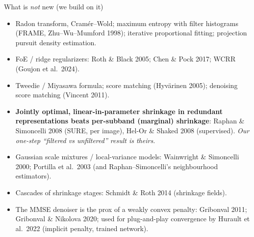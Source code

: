 \documentclass[10pt,aspectratio=169]{beamer}
\begin{document}
\begin{frame}{What is \emph{not} new (we build on it)}
\begin{oldbox}[title={Known results used here}]
\small
\begin{itemize}
\item Radon transform, Cram\'er--Wold; maximum entropy with filter histograms (FRAME, Zhu--Wu--Mumford 1998);
      iterative proportional fitting; projection pursuit density estimation.
\item FoE / ridge regularizers: Roth \& Black 2005; Chen \& Pock 2017; WCRR (Goujon et al.\ 2024).
\item Tweedie / Miyasawa formula; score matching (Hyv\"arinen 2005); denoising score matching (Vincent 2011).
\item \textbf{Jointly optimal, linear-in-parameter shrinkage in redundant representations beats
      per-subband (marginal) shrinkage}: Raphan \& Simoncelli 2008 (SURE, per image), Hel-Or \& Shaked
      2008 (supervised). \emph{Our one-step ``filtered vs unfiltered'' result is theirs.}
\item Gaussian scale mixtures / local-variance models: Wainwright \& Simoncelli 2000; Portilla et al.\ 2003
      (and Raphan--Simoncelli's neighbourhood estimators).
\item Cascades of shrinkage stages: Schmidt \& Roth 2014 (shrinkage fields).
\item The MMSE denoiser is the prox of a weakly convex penalty: Gribonval 2011; Gribonval \& Nikolova 2020;
      used for plug-and-play convergence by Hurault et al.\ 2022 (implicit penalty, trained network).
\end{itemize}
\end{oldbox}
\end{frame}
\end{document}
